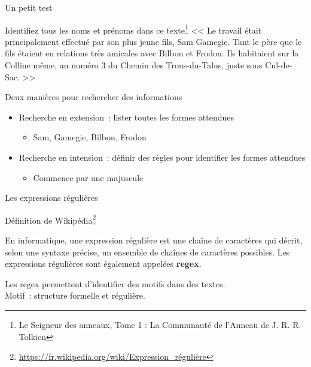 \documentclass[serif, aspectratio=169]{beamer}
\begin{document}
\begin{frame}{Un petit test}
    \begin{block}{Identifiez tous les noms et prénoms dans ce texte\footnote{Le Seigneur des anneaux, Tome 1 : La Communauté de l'Anneau de J. R. R. Tolkien}}
        \justify
         << Le travail était principalement effectué par son plus jeune fils, Sam Gamegie. Tant le père que le fils étaient en relations très amicales avec Bilbon et Frodon. Ils habitaient sur la Colline même, au numéro 3 du Chemin des Trous-du-Talus, juste sous Cul-de-Sac. >>
    \end{block}
    \vfill
    \pause
    \begin{block}{Deux manières pour rechercher des informations}
        \begin{itemize}
            \pause
            \item Recherche en extension~: lister toutes les formes attendues
            \begin{itemize}
                \pause
                \item Sam, Gamegie, Bilbon, Frodon
            \end{itemize}
            \pause
            \item Recherche en intension~: définir des règles pour identifier les formes attendues
            \begin{itemize}
                \pause
                \item Commence par une majuscule
            \end{itemize}
        \end{itemize}
    \end{block}
\end{frame}

\begin{frame}{Les expressions régulières}
    \begin{block}{Définition de Wikipédia\footnote{\url{https://fr.wikipedia.org/wiki/Expression_régulière}}}
        \begin{tcolorbox}
            En informatique, une expression régulière est une chaîne de caractères qui décrit, selon une syntaxe précise, un ensemble de chaînes de caractères possibles. Les expressions régulières sont également appelées \textbf{regex}.
        \end{tcolorbox}
    \end{block}
    \pause
    \begin{center}
        \Large
        Les regex permettent d'identifier des motifs dans des textes. \\
        \pause
        Motif~: structure formelle et régulière.
    \end{center}
\end{frame}
\end{document}
